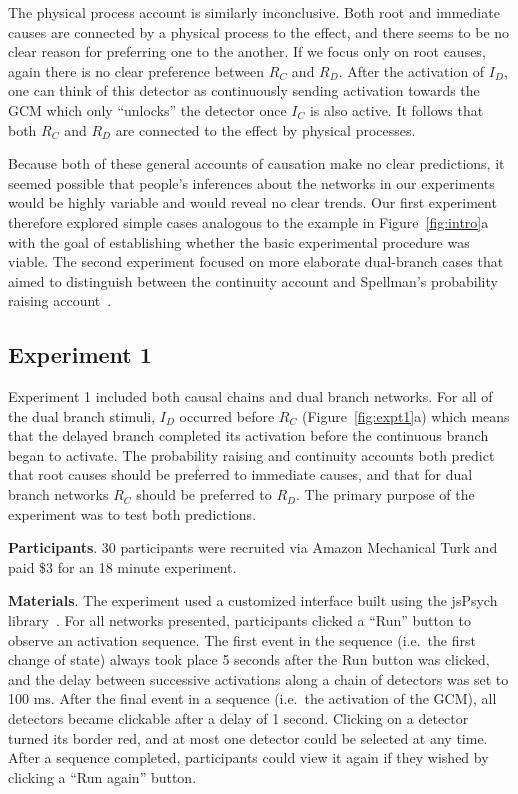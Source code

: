 \documentclass[10pt,letterpaper]{article}
\newcommand{\ev}[2]{$#1_#2$}
\begin{document}
The physical process account is similarly inconclusive. Both root and immediate causes are connected by a physical process to the effect, and there seems to be no clear reason for preferring one to the another. If we focus only on root causes, again there is no clear preference between \ev{R}{C} and \ev{R}{D}. After the activation of \ev{I}{D}, one can think of this detector as continuously sending activation towards the GCM which only ``unlocks'' the detector once \ev{I}{C} is also active. It follows that both \ev{R}{C} and \ev{R}{D} are connected to the effect by physical processes.

Because both of these general accounts of causation make no clear predictions, it seemed possible that people's inferences about the networks in our experiments would be highly variable and would reveal no clear trends. Our first experiment therefore explored simple cases analogous to the example in Figure~\ref{fig:intro}a with the goal of establishing whether the basic experimental procedure was viable.  The second experiment focused on more elaborate dual-branch cases that aimed to distinguish between the continuity account and Spellman's probability raising account~\cite{spellman97}.

\subsection{Experiment 1}

Experiment 1 included both causal chains and dual branch networks. For all of the dual branch stimuli, \ev{I}{D} occurred before \ev{R}{C} (Figure~\ref{fig:expt1}a) which means that the delayed branch completed its activation before the continuous branch began to activate. The probability raising and continuity accounts both predict that root causes should be preferred to immediate causes, and that for dual branch networks \ev{R}{C} should be preferred to \ev{R}{D}. The primary purpose of the experiment was to test both predictions. 

\textbf{Participants}. 30 participants were recruited via Amazon Mechanical Turk and paid \$3 for an 18 minute experiment.



\textbf{Materials}. The experiment used a customized interface built using the jsPsych library~\cite{jspsych}. For all networks presented, participants clicked a ``Run'' button to observe an activation sequence. The first event in the sequence (i.e.\ the first change of state) always took place 5 seconds after the Run button was clicked, and the delay between successive activations along a chain of detectors was set to 100 ms. After the final event in a sequence (i.e.\ the activation of the GCM), all detectors became clickable after a delay of 1 second. Clicking on a detector turned its border red, and at most one detector could be selected at any time. After a sequence completed, participants could view it again if they wished by clicking a ``Run again'' button.
\end{document}

